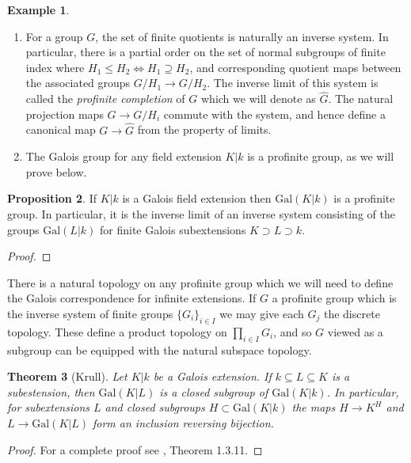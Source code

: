 \documentclass{article}
\newtheorem{theorem}{Theorem}[section]
\theoremstyle{definition}
\newtheorem{proposition}[theorem]{Proposition}
\newtheorem{example}[theorem]{Example}
\theoremstyle{remark}
\begin{document}
\begin{example} \text{}
\begin{enumerate}
	\item For a group $G$, the set of finite quotients is naturally an inverse system.
		In particular, there is a partial order on the set of normal subgroups of finite index where $H_1 \leq H_2 \Longleftrightarrow H_1 \supseteq H_2$, and corresponding quotient maps between the associated groups $G/H_1 \to G/H_2$.
		The inverse limit of this system is called the \textit{profinite completion} of $G$ which we will denote as $\widehat{G}$.	
		The natural projection maps $G \to G/H_i$ commute with the system, and hence define a canonical map $G \to \widehat{G}$ from the property of limits.
	\item The Galois group for any field extension $K|k$ is a profinite group, as we will prove below.
\end{enumerate}
\end{example}
\begin{proposition}
	If $K|k$ is a Galois field extension then $\text{Gal}(K|k)$ is a profinite group.
	In particular, it is the inverse limit of an inverse system consisting of the groups $\text{Gal}(L|k)$ for finite Galois subextensions $K \supset L \supset k$.
\end{proposition}
\begin{proof}
\end{proof}

	There is a natural topology on any profinite group which we will need to define the Galois correspondence for infinite extensions.
	If $G$ a profinite group which is the inverse system of finite groups $\{G_i\}_{i \in I}$ we may give each $G_j$ the discrete topology.
	These define a product topology on $\prod_{i \in I} G_i$, and so $G$ viewed as a subgroup can be equipped with the natural subspace topology.


\begin{theorem}[Krull]
	Let $K | k$ be a Galois extension.
	If $k \subseteq L \subseteq K$ is a subestension, then $\text{Gal}(K|L)$ is a closed subgroup of $\text{Gal}(K|k)$.
	In particular, for subextensions $L$ and closed subgroups $H \subset \text{Gal}(K|k)$ the maps $H \to K^H$ and $L \to \text{Gal}(K|L)$ form an inclusion reversing bijection.
\end{theorem}

\begin{proof}
	For a complete proof see \cite{Szamuely}, Theorem 1.3.11. 
\end{proof}
\end{document}
